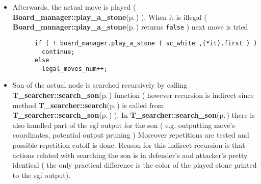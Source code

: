 \begin{itemize}
\item Afterwards, the actual move is played ( {\bf Board\_\-manager::play\_\-a\_\-stone}{\rm (p.\,\pageref{classBoard__manager_a4})} ). When it is illegal ( {\bf Board\_\-manager::play\_\-a\_\-stone}{\rm (p.\,\pageref{classBoard__manager_a4})} returns {\tt false} ) next move is tried 

\footnotesize\begin{verbatim}      if ( ! board_manager.play_a_stone ( sc_white ,(*it).first ) ) 
        continue; 
      else
        legal_moves_num++;
\end{verbatim}
\normalsize
\end{itemize}


\begin{itemize}
\item Son of the actual node is searched recursively by calling {\bf T\_\-searcher::search\_\-son}{\rm (p.\,\pageref{classT__searcher_a11})} function ( however recursion is indirect since method {\bf T\_\-searcher::search}{\rm (p.\,\pageref{classT__searcher_a0})} is called from {\bf T\_\-searcher::search\_\-son}{\rm (p.\,\pageref{classT__searcher_a11})} ). In {\bf T\_\-searcher::search\_\-son}{\rm (p.\,\pageref{classT__searcher_a11})} there is also handled part of the sgf output for the son ( e.g. outputting move's coordinates, potential output pruning ) Moreover repetitions are tested and possible repetition cutoff is done. Reason for this indirect recursion is that actions related with searching the son is in defender's and attacker's pretty identical ( the only practical difference is the color of the played stone printed to the sgf output).\end{itemize}




